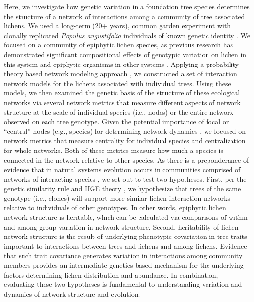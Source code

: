 \documentclass[fleqn,12pt]{olplainarticle}
\begin{document}
Here, we investigate how genetic variation in a foundation tree
species determines the structure of a network of interactions among a
community of tree associated lichens.  We used a long-term (20+
years), common garden experiment with clonally replicated
\textit{Populus angustifolia} individuals of known genetic identity
\citep{Martinsen2001HybridSpecies}. We focused on a community of
epiphytic lichen species, as previous research has demonstrated
significant compositional effects of genotypic variation on lichen in
this system \citep{Lamit2011, Lamit2015a, Lamit2015c} and epiphytic
organisms in other systems \citep{Winfree2011, Zytynska2011}. Applying
a probability-theory based network modeling approach
\citep{Araujo2011}, we constructed a set of interaction network models
for the lichens associated with individual trees. Using these models,
we then examined the genetic basis of the structure of these
ecological networks via several network metrics that measure different
aspects of network structure at the scale of individual species (i.e.,
nodes) or the entire network observed on each tree genotype. Given the
potential importance of focal or ``central'' nodes (e.g., species) for
determining network dynamics \citep{Lieberman2005EvolutionaryGraphs},
we focused on network metrics that measure centrality for individual
species and centralization for whole networks. Both of these metrics
measure how much a species is connected in the network relative to
other species. As there is a preponderance of evidence that in natural
systems evolution occurs in communities comprised of networks of
interacting species \citep{Lau2016afix, Keith2017, Thompson2013,
  Bascompte2006}, we set out to test two hypotheses. First, per the
genetic similarity rule \citep{Bangert2006} and IIGE theory
\citep{Whitham2020IntraspecificEvolution}, we hypothesize that trees
of the same genotype (i.e., clones) will support more similar lichen
interaction networks relative to individuals of other genotypes. In
other words, epiphytic lichen network structure is heritable, which
can be calculated via comparisons of within and among group variation
in network structure. Second, heritability of lichen network structure
is the result of underlying phenotypic covariation in tree traits
important to interactions between trees and lichens and among
lichens. Evidence that such trait covariance generates variation in
interactions among community members provides an intermediate
genetics-based mechanism for the underlying factors determining lichen
distribution and abundance. In combination, evaluating these two
hypotheses is fundamental to understanding variation and dynamics of
network structure and evolution.
\end{document}
